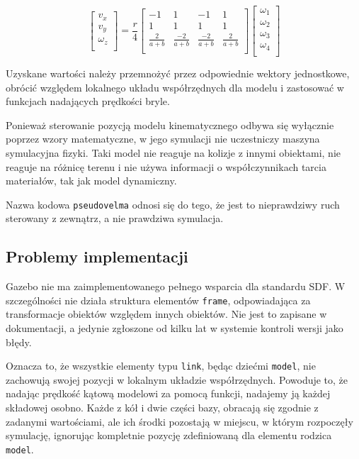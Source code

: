 	\begin{equation}
	\begin{bmatrix}
	v_x \\
	v_y \\
	\omega_z \\
	\end{bmatrix}
	=
	\frac{r}{4}
	\begin{bmatrix}
	-1 & 1 & -1 & 1 \\
	1 & 1 & 1 & 1 \\
	\frac{2}{a+b} & \frac{-2}{a+b} & \frac{-2}{a+b} & \frac{2}{a+b} \\
	\end{bmatrix}
	\begin{bmatrix}
	\omega_1 \\
	\omega_2 \\
	\omega_3 \\
	\omega_4 \\
	\end{bmatrix}
	\end{equation}
	
	Uzyskane wartości należy przemnożyć przez odpowiednie wektory jednostkowe, obrócić względem lokalnego układu współrzędnych dla modelu i zastosować w funkcjach nadających prędkości bryle.

	Ponieważ sterowanie pozycją modelu kinematycznego odbywa się wyłącznie poprzez wzory matematyczne, w jego symulacji nie uczestniczy maszyna symulacyjna fizyki.
	Taki model nie reaguje na kolizje z innymi obiektami, nie reaguje na różnicę terenu i nie używa informacji o współczynnikach tarcia materiałów, tak jak model dynamiczny.

	Nazwa kodowa \texttt{pseudovelma} odnosi się do tego, że jest to nieprawdziwy ruch sterowany z zewnątrz, a nie prawdziwa symulacja.

	\subsection{Problemy implementacji}
		Gazebo nie ma zaimplementowanego pełnego wsparcia dla standardu SDF.
		W szczególności nie działa struktura elementów \texttt{frame}, odpowiadająca za transformacje obiektów względem innych obiektów.
		Nie jest to zapisane w dokumentacji, a jedynie zgłoszone od kilku lat w systemie kontroli wersji jako błędy.

		Oznacza to, że wszystkie elementy typu \texttt{link}, będąc dziećmi \texttt{model}, nie zachowują swojej pozycji w lokalnym układzie współrzędnych.
		Powoduje to, że nadając prędkość kątową modelowi za pomocą funkcji, nadajemy ją każdej składowej osobno.
		Każde z kół i dwie części bazy, obracają się zgodnie z zadanymi wartościami, ale ich środki pozostają w miejscu, w którym rozpoczęły symulację,
		ignorując kompletnie pozycję zdefiniowaną dla elementu rodzica \texttt{model}.
		
